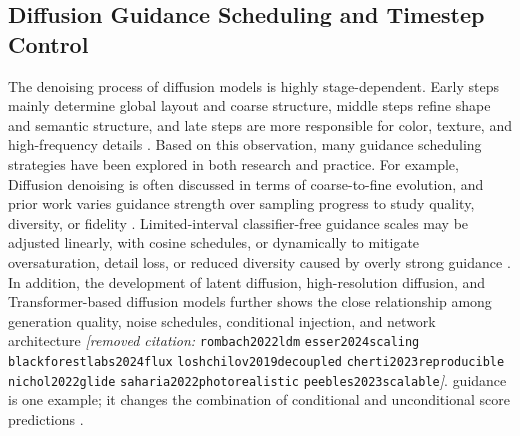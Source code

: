\documentclass[times,twocolumn,final]{elsarticle}
\providecommand{\DIFadd}[1]{{\protect\color{blue} \sf #1}} %
\providecommand{\DIFdel}[1]{{\protect\color{red} \scriptsize #1}} %
\providecommand{\DIFaddbegin}{} %
\providecommand{\DIFaddend}{} %
\providecommand{\DIFdelbegin}{} %
\providecommand{\DIFdelend}{} %
\begin{document}
\subsection{Diffusion Guidance Scheduling and Timestep Control}
\label{subsec:guidance}

\DIFdelbegin \DIFdel{The denoising process of diffusion models is highly stage-dependent. Early steps mainly determine global layout and coarse structure, middle steps refine shape and semantic structure, and late steps are more responsible for color, texture, and high-frequency details \cite{ho2020ddpm,song2021ddim}. Based on this observation, many guidance scheduling strategies have been explored in both research and practice. For example, }\DIFdelend \DIFaddbegin \DIFadd{Diffusion denoising is often discussed in terms of coarse-to-fine evolution, and prior work varies guidance strength over sampling progress to study quality, diversity, or fidelity \cite{ho2020ddpm,song2021ddim,ho2022cfg,castillo2023adaptive}. Limited-interval }\DIFaddend classifier-free \DIFdelbegin \DIFdel{guidance scales may be adjusted linearly, with cosine schedules, or dynamically to mitigate oversaturation, detail loss, or reduced diversity caused by overly strong guidance \cite{ho2022cfg,castillo2023adaptive}. In addition, the development of latent diffusion, high-resolution diffusion, and Transformer-based diffusion models further shows the close relationship among generation quality, noise schedules, conditional injection, and network architecture \textit{[removed citation: }\texttt{rombach2022ldm} \texttt{esser2024scaling} \texttt{blackforestlabs2024flux} \texttt{loshchilov2019decoupled} \texttt{cherti2023reproducible} \texttt{nichol2022glide} \texttt{saharia2022photorealistic} \texttt{peebles2023scalable}\textit{]}. }\DIFdelend \DIFaddbegin \DIFadd{guidance is one example; it changes the combination of conditional and unconditional score predictions \cite{kynkanniemi2024limited}.
}\DIFaddend 
\end{document}
